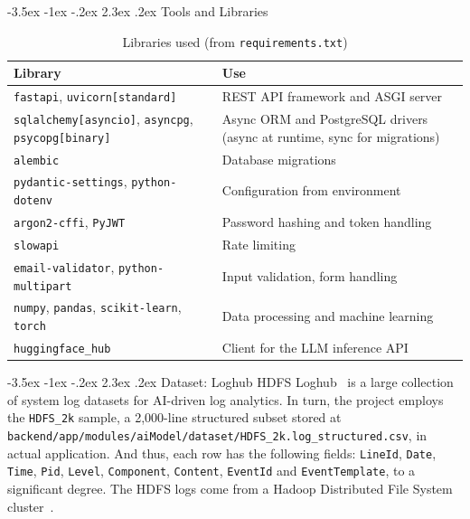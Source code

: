 \documentclass[12pt,a4paper]{report}
\makeatletter
\renewcommand{\arraystretch}{1.05}
\renewcommand\section{\@startsection {section}{1}{\z@}%
  {-3.5ex \@plus -1ex \@minus -.2ex}%
  {2.3ex \@plus .2ex}%
  {\normalfont\fontsize{17}{21}\selectfont\bfseries}}
\makeatother
\begin{document}
\section{Tools and Libraries}
\begin{table}[htbp]
\centering
\caption{Libraries used (from \texttt{requirements.txt})}
\label{tab:libs}
\small
\renewcommand{\arraystretch}{1.2}
\begin{tabularx}{\textwidth}{>{\raggedright\arraybackslash}p{4.2cm} >{\raggedright\arraybackslash}X}
\toprule
\textbf{Library} & \textbf{Use}\\
\midrule
\texttt{fastapi}, \texttt{uvicorn[standard]} & REST API framework and ASGI server\\
\texttt{sqlalchemy[asyncio]}, \texttt{asyncpg}, \texttt{psycopg[binary]} & Async ORM and PostgreSQL drivers (async at runtime, sync for migrations)\\
\texttt{alembic} & Database migrations\\
\texttt{pydantic-settings}, \texttt{python-dotenv} & Configuration from environment\\
\texttt{argon2-cffi}, \texttt{PyJWT} & Password hashing and token handling\\
\texttt{slowapi} & Rate limiting\\
\texttt{email-validator}, \texttt{python-multipart} & Input validation, form handling\\
\texttt{numpy}, \texttt{pandas}, \texttt{scikit-learn}, \texttt{torch} & Data processing and machine learning\\
\texttt{huggingface\_hub} & Client for the LLM inference API\\
\bottomrule
\end{tabularx}
\end{table}

\section{Dataset: Loghub HDFS}
Loghub~\cite{loghub} is a large collection of system log datasets for AI-driven log analytics. In turn, the project employs the \texttt{HDFS\_2k} sample, a 2{,}000-line structured subset stored at \texttt{backend/app/modules/aiModel/dataset/HDFS\_2k.log\_structured.csv}, in actual application. And thus, each row has the following fields: \texttt{LineId}, \texttt{Date}, \texttt{Time}, \texttt{Pid}, \texttt{Level}, \texttt{Component}, \texttt{Content}, \texttt{EventId} and \texttt{EventTemplate}, to a significant degree. The HDFS logs come from a Hadoop Distributed File System cluster~\cite{xu2009}.
\end{document}
